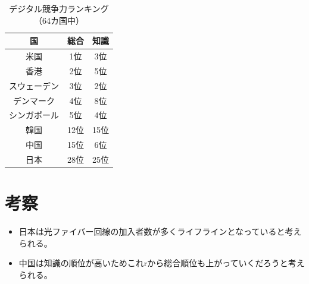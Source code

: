 \documentclass[a4paper,11pt,dvipdfmx]{ujarticle}
\begin{document}

\begin{table}[htbp]
   \centering
   \caption{デジタル競争力ランキング（64カ国中）} 
   \label{tbl:デジタル}
   \begin{tabular}{|c|c|c|}
       \hline
       国 & 総合 & 知識 \\
       \hline
       米国 & 1位 & 3位 \\
       \hline
       香港 & 2位 & 5位 \\
       \hline
       スウェーデン & 3位 & 2位 \\
       \hline
       デンマーク & 4位 & 8位 \\
       \hline
       シンガポール & 5位 & 4位 \\
       \hline
       韓国 & 12位 & 15位 \\
       \hline
       中国 & 15位 & 6位 \\
       \hline
       日本 & 28位  & 25位 \\
       \hline
   \end{tabular}
\end{table}


\section{考察}
\begin{itemize}
    \item 日本は光ファイバー回線の加入者数が多くライフラインとなっていると考えられる。
    \item 中国は知識の順位が高いためこれrから総合順位も上がっていくだろうと考えられる。
\end{itemize}
%

%


\end{document}
